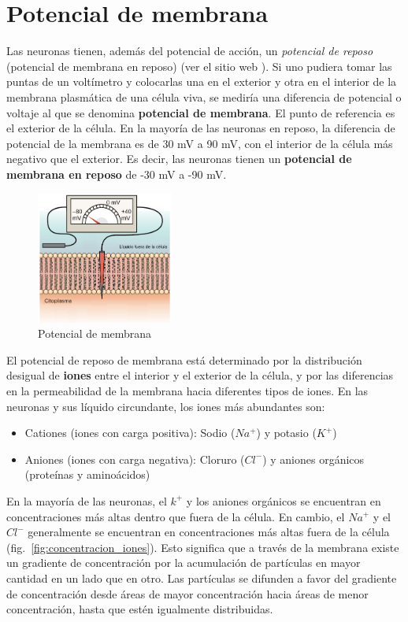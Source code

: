 \section{Potencial de membrana}\label{section:Potencial_Membrana}
Las neuronas tienen, además del potencial de acción, un \textit{potencial de reposo} (potencial de membrana en reposo) (ver  el sitio web \cite{khanacademywebsite}). Si uno pudiera tomar las puntas de un voltímetro y colocarlas una en el exterior y otra en el interior de la membrana plasmática de una célula viva, se mediría una diferencia de potencial o voltaje al que se denomina \textbf{potencial de membrana}. El punto de referencia es el exterior de la célula. En la mayoría de las neuronas en reposo, la diferencia de potencial de la membrana es de 30 mV a 90 mV, con el interior de la célula más negativo que el exterior. Es decir, las neuronas tienen un \textbf{potencial de membrana en reposo} de -30 mV a -90 mV.
\begin{figure}[htbp!]
    \centering
    \includegraphics[width=4.5cm]{figures/potencial_membrana.png}
    \caption{Potencial de membrana}
    \label{fig:Potencial_membrana}
\end{figure}
El potencial de reposo de membrana está determinado por la distribución desigual de \textbf{iones} entre el interior y el exterior de la célula, y por las diferencias en la permeabilidad de la membrana hacia diferentes tipos de iones. En las neuronas y sus líquido circundante, los iones más abundantes son:
\begin{itemize}
    \item Cationes (iones con carga positiva): Sodio ($Na^+$) y potasio ($K^+$)
    \item Aniones (iones con carga negativa): Cloruro ($Cl^-$) y aniones orgánicos (proteínas y aminoácidos)
\end{itemize}
\newpage
En la mayoría de las neuronas, el $k^+$ y los aniones orgánicos se encuentran en concentraciones más altas dentro que fuera de la célula. En cambio, el $Na^+$ y el $Cl^-$ generalmente se encuentran en concentraciones más altas fuera de la célula (fig.~\ref{fig:concentracion_iones}). Esto significa que a través de la membrana existe un gradiente de concentración por la acumulación de partículas en mayor cantidad en un lado que en otro. Las partículas se difunden a favor del gradiente de concentración desde áreas de mayor concentración hacia áreas de menor concentración, hasta que estén igualmente distribuidas.
